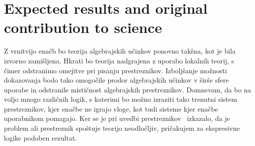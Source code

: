 \documentclass{article}
\begin{document}
\section*{Expected results and original contribution to science}

Z vrnitvijo enačb  bo teorija algebrajskih učinkov ponovno takšna, kot je bila izvorno zamišljena. Hkrati bo teorija nadgrajena z uporabo lokalnih teorij, s čimer odstranimo omejitve pri pisanju prestreznikov. Izboljšanje možnosti dokazovanja bodo tako omogočile prodor algebrajskih učinkov v širše sfere uporabe in odstranile mističnost algebrajskih prestreznikov. Domnevam, da bo na voljo mnogo različnih logik, s katerimi bo možno izraziti tako trenutni sistem prestreznikov, kjer enačbe ne igrajo vloge, kot tudi sisteme kjer enačbe uporabnikom pomagajo. Ker se je pri uvedbi prestreznikov~\cite{DBLP:conf/esop/PlotkinP09} izkazalo, da je problem ali prestreznik spoštuje teorijo neodločljiv, pričakujem za ekspresivne logike podoben rezultat.




\end{document}
